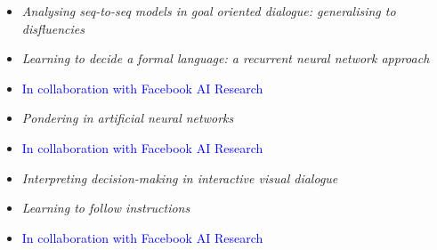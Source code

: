 {{{{{{{
{\begin{itemize}
  \item[] \textit{Analysing seq-to-seq models in goal oriented dialogue: generalising to disfluencies}
\end{itemize}
}

{
{\begin{itemize}
  \item[] \textit{Learning to decide a formal language: a recurrent neural network approach}
  \item[] \textcolor{blue}{\normalfont In collaboration with Facebook AI Research\vspace{1mm}}
\end{itemize}
}

{
{\begin{itemize}
  \item[] \textit{Pondering in artificial neural networks}
  \item[] \textcolor{blue}{\normalfont In collaboration with Facebook AI Research\vspace{1mm}}
\end{itemize}}}

{
{\begin{itemize}
  \item[] \textit{Interpreting decision-making in interactive visual dialogue}
\end{itemize}}}

{
{\begin{itemize}
  \item[] \textit{Learning to follow instructions}
  \item[] \textcolor{blue}{\normalfont In collaboration with Facebook AI Research\vspace{1mm}}
\end{itemize}}}

}}}}}}}}
